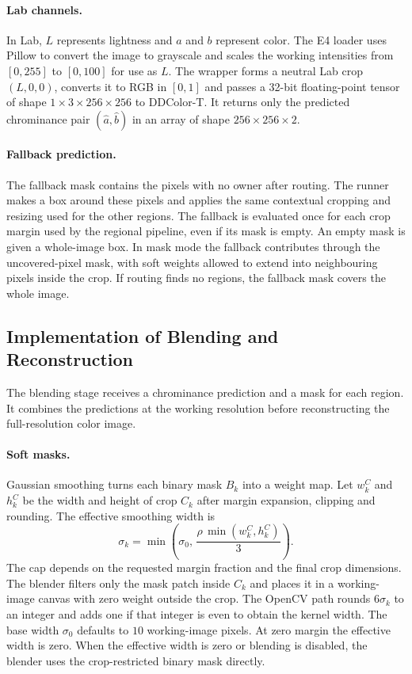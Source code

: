 \documentclass{FastFyp}
\begin{document}
\paragraph{Lab channels.} In Lab, $L$ represents lightness and $a$ and $b$ represent
color. The E4 loader uses Pillow to convert the image to grayscale and scales
the working intensities from $[0,255]$ to $[0,100]$ for use as $L$. The wrapper
forms a neutral Lab crop $(L,0,0)$, converts it to RGB in $[0,1]$ and passes
a 32-bit floating-point tensor of shape $1\times3\times256\times256$ to
DDColor-T. It returns only the predicted chrominance pair $(\hat a,\hat b)$
in an array of shape $256\times256\times2$.

\paragraph{Fallback prediction.} The fallback mask contains the pixels with no
owner after routing. The runner makes a box around these pixels and applies
the same contextual cropping and resizing used for the other regions.
The fallback is evaluated once for each crop margin used by the regional
pipeline, even if its mask is empty. An empty mask is given a whole-image
box. In mask mode the fallback contributes through the uncovered-pixel mask,
with soft weights allowed to extend into neighbouring pixels inside the crop.
If routing finds no regions, the fallback mask covers the whole image.

\subsection{Implementation of Blending and Reconstruction}
\label{sec:b_blending}
The blending stage receives a chrominance prediction and a mask for each region.
It combines the predictions at the working resolution before reconstructing
the full-resolution color image.

\paragraph{Soft masks.} Gaussian smoothing turns each binary mask $B_k$ into a
weight map. Let $w_k^C$ and $h_k^C$ be the width and height of crop $C_k$ after
margin expansion, clipping and rounding. The effective smoothing width is
\begin{equation}
\sigma_k = \min\!\left(\sigma_0,\,\frac{\rho\,\min(w_k^C,h_k^C)}{3}\right).
\end{equation}
The cap depends on the requested margin fraction and the final crop
dimensions. The blender filters only the mask patch inside $C_k$ and places
it in a working-image canvas with zero weight outside the crop. The OpenCV
path rounds $6\sigma_k$ to an integer and adds one if that integer is even
to obtain the kernel width. The base width $\sigma_0$ defaults to $10$
working-image pixels. At zero margin the effective width is zero. When the
effective width is zero or blending is disabled, the blender uses the
crop-restricted binary mask directly.
\end{document}
